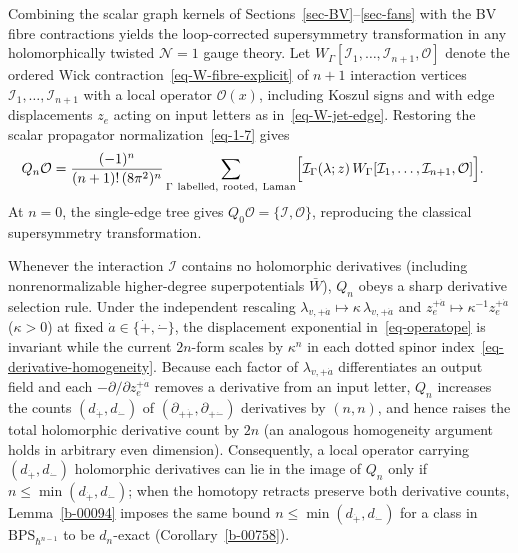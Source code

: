 \documentclass[11pt]{article}
\numberwithin{equation}{section}
\numberwithin{figure}{section}
\numberwithin{table}{section}
\begin{document}
Combining the scalar graph kernels of Sections~\ref{sec-BV}--\ref{sec-fans} with the BV fibre contractions yields the loop-corrected supersymmetry transformation in any holomorphically twisted $\mathcal N=1$ gauge theory. Let $W_\Gamma[\mathcal I_1,\ldots,\mathcal I_{n+1},\mathcal O]$ denote the ordered Wick contraction~\eqref{eq-W-fibre-explicit} of $n+1$ interaction vertices $\mathcal I_1,\ldots,\mathcal I_{n+1}$ with a local operator $\mathcal O(x)$, including Koszul signs and with edge displacements $z_e$ acting on input letters as in~\eqref{eq-W-jet-edge}. Restoring the scalar propagator normalization~\eqref{eq-1-7} gives
\begin{equation}\label{eq-2-3}
\begin{aligned}
Q_n\mathcal O
={}&\frac{(-1)^n}{(n+1)!\,(8\pi^2)^n}
\sum_{\substack{\Gamma\ \mathrm{labelled,\ rooted,\ Laman}}}
\Bigl[\mathcal I_\Gamma(\lambda;z)\,
W_\Gamma[\mathcal I_1,\ldots,\mathcal I_{n+1},\mathcal O]\Bigr].
\end{aligned}
\end{equation}
At $n=0$, the single-edge tree gives $Q_0\mathcal O=\{\mathcal I,\mathcal O\}$, reproducing the classical supersymmetry transformation.

Whenever the interaction $\mathcal I$ contains no holomorphic derivatives (including nonrenormalizable higher-degree superpotentials $\bar W$), $Q_n$ obeys a sharp derivative selection rule. Under the independent rescaling $\lambda_{v,+\dot a}\mapsto \kappa\,\lambda_{v,+\dot a}$ and $z_e^{+\dot a}\mapsto \kappa^{-1}z_e^{+\dot a}$ ($\kappa>0$) at fixed $\dot a\in\{\dot+,\dot-\}$, the displacement exponential in~\eqref{eq-operatope} is invariant while the current $2n$-form scales by $\kappa^n$ in each dotted spinor index~\eqref{eq-derivative-homogeneity}. Because each factor of $\lambda_{v,+\dot a}$ differentiates an output field and each $-\partial/\partial z_e^{+\dot a}$ removes a derivative from an input letter, $Q_n$ increases the counts $(d_{\dot+},d_{\dot-})$ of $(\partial_{+\dot+},\partial_{+\dot-})$ derivatives by $(n,n)$, and hence raises the total holomorphic derivative count by $2n$ (an analogous homogeneity argument holds in arbitrary even dimension). Consequently, a local operator carrying $(d_{\dot+},d_{\dot-})$ holomorphic derivatives can lie in the image of $Q_n$ only if $n\le\min(d_{\dot+},d_{\dot-})$; when the homotopy retracts preserve both derivative counts, Lemma~\ref{b-00094} imposes the same bound $n\le\min(d_{\dot+},d_{\dot-})$ for a class in $\mathrm{BPS}_{\hbar^{n-1}}$ to be $d_n$-exact (Corollary~\ref{b-00758}).
\end{document}
